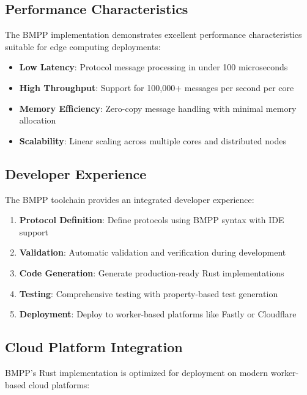 \documentclass[11pt,a4paper]{article}
\begin{document}
	\subsection{Performance Characteristics}
	\label{subsec:performance}
	
	The BMPP implementation demonstrates excellent performance characteristics suitable for edge computing deployments:
	
	\begin{itemize}
		\item \textbf{Low Latency}: Protocol message processing in under 100 microseconds
		\item \textbf{High Throughput}: Support for 100,000+ messages per second per core
		\item \textbf{Memory Efficiency}: Zero-copy message handling with minimal memory allocation
		\item \textbf{Scalability}: Linear scaling across multiple cores and distributed nodes
	\end{itemize}
	
	\subsection{Developer Experience}
	\label{subsec:devexp}
	
	The BMPP toolchain provides an integrated developer experience:
	
	\begin{enumerate}
		\item \textbf{Protocol Definition}: Define protocols using BMPP syntax with IDE support
		\item \textbf{Validation}: Automatic validation and verification during development
		\item \textbf{Code Generation}: Generate production-ready Rust implementations
		\item \textbf{Testing}: Comprehensive testing with property-based test generation
		\item \textbf{Deployment}: Deploy to worker-based platforms like Fastly or Cloudflare
	\end{enumerate}
	
	\subsection{Cloud Platform Integration}
	\label{subsec:cloud}
	
	BMPP's Rust implementation is optimized for deployment on modern worker-based cloud platforms:
	
\end{document}
